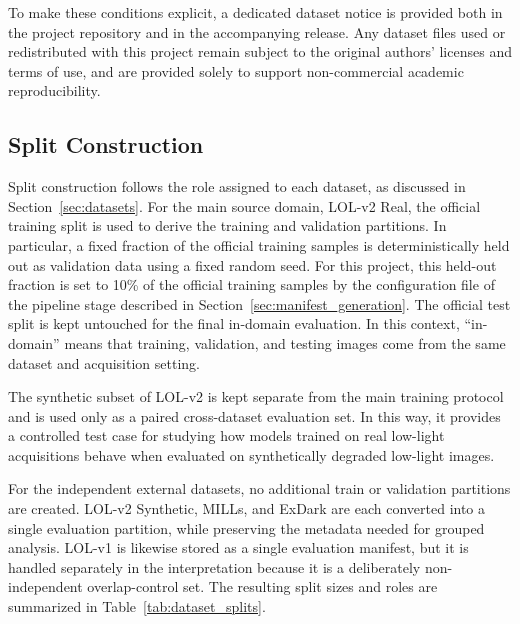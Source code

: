 To make these conditions explicit, a dedicated dataset notice is provided both in the project repository and in the accompanying release. Any dataset files used or redistributed with this project remain subject to the original authors’ licenses and terms of use, and are provided solely to support non-commercial academic reproducibility.

\subsection{Split Construction}

Split construction follows the role assigned to each dataset, as discussed in Section~\ref{sec:datasets}. For the main source domain, LOL-v2 Real, the official training split is used to derive the training and validation partitions. In particular, a fixed fraction of the official training samples is deterministically held out as validation data using a fixed random seed. For this project, this held-out fraction is set to 10\% of the official training samples by the configuration file of the pipeline stage described in Section~\ref{sec:manifest_generation}. The official test split is kept untouched for the final in-domain evaluation. In this context, ``in-domain'' means that training, validation, and testing images come from the same dataset and acquisition setting.

The synthetic subset of LOL-v2 is kept separate from the main training protocol and is used only as a paired cross-dataset evaluation set. In this way, it provides a controlled test case for studying how models trained on real low-light acquisitions behave when evaluated on synthetically degraded low-light images.

For the independent external datasets, no additional train or validation partitions are created. LOL-v2 Synthetic, MILLs, and ExDark are each converted into a single evaluation partition, while preserving the metadata needed for grouped analysis. LOL-v1 is likewise stored as a single evaluation manifest, but it is handled separately in the interpretation because it is a deliberately non-independent overlap-control set. The resulting split sizes and roles are summarized in Table~\ref{tab:dataset_splits}.

